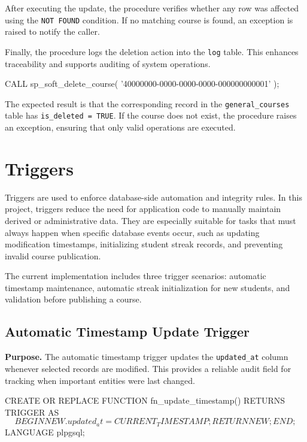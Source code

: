 After executing the update, the procedure verifies whether any row was affected using the \texttt{NOT FOUND} condition. If no matching course is found, an exception is raised to notify the caller.

Finally, the procedure logs the deletion action into the \texttt{log} table. This enhances traceability and supports auditing of system operations.

\begin{sqlcode}[caption={Testing course soft deletion procedure},label={lst:test-procedure-soft-delete-course}]
CALL sp_soft_delete_course(
    '40000000-0000-0000-0000-000000000001'
);
\end{sqlcode}

The expected result is that the corresponding record in the \texttt{general\_courses} table has \texttt{is\_deleted = TRUE}. If the course does not exist, the procedure raises an exception, ensuring that only valid operations are executed.
\section{Triggers}

Triggers are used to enforce database-side automation and integrity rules. In this project, triggers reduce the need for application code to manually maintain derived or administrative data. They are especially suitable for tasks that must always happen when specific database events occur, such as updating modification timestamps, initializing student streak records, and preventing invalid course publication.

The current implementation includes three trigger scenarios: automatic timestamp maintenance, automatic streak initialization for new students, and validation before publishing a course.

\subsection{Automatic Timestamp Update Trigger}

\textbf{Purpose.} The automatic timestamp trigger updates the \texttt{updated\_at} column whenever selected records are modified. This provides a reliable audit field for tracking when important entities were last changed.

\begin{sqlcode}[caption={Trigger function for automatic timestamp maintenance},label={lst:trigger-update-timestamp-function}]
CREATE OR REPLACE FUNCTION fn_update_timestamp()
RETURNS TRIGGER AS $$
BEGIN
    NEW.updated_at = CURRENT_TIMESTAMP;
    RETURN NEW;
END;
$$ LANGUAGE plpgsql;
\end{sqlcode}

